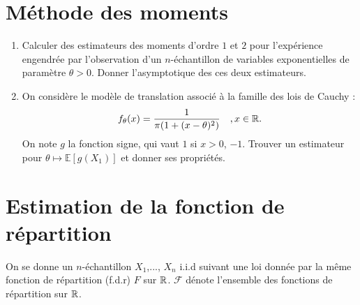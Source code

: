 \documentclass[a4paper]{article}
\begin{document}
\section{Méthode des moments}
\begin{enumerate}
\item Calculer des estimateurs des moments d'ordre $1$ et $2$ pour l'expérience engendrée par l'observation d'un $n$-échantillon de variables exponentielles de paramètre $\theta>0$. Donner l'asymptotique des ces deux estimateurs.
\item On considère le modèle de translation associé à la famille des lois de Cauchy :
\[f_\theta(x)=\frac{1}{\pi(1+(x-\theta)^2)}\quad, x\in\mathbb R.\]
On note $g$ la fonction signe, qui vaut $1$ si $x>0$, $-1$. Trouver un estimateur pour $\theta\mapsto \mathbb E[g(X_1)]$ et donner ses propriétés.
\end{enumerate}
\section{Estimation de la fonction de répartition}

On se donne un $n$-échantillon $X_1$,..., $X_n$ i.i.d suivant une loi donnée par la même fonction de répartition (f.d.r) $F$ sur $\mathbb R$. $\mathcal F$ dénote l'ensemble des fonctions de répartition sur $\mathbb R$.
\end{document}
